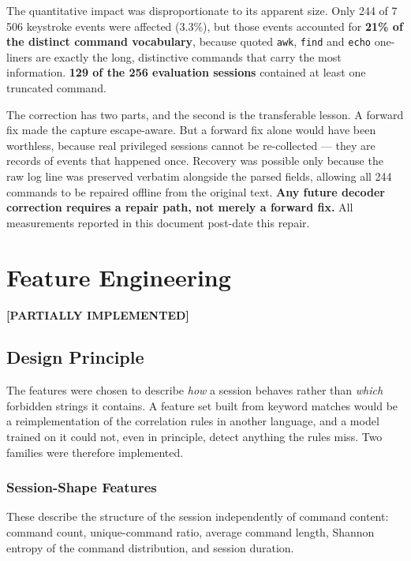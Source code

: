 \documentclass{classeENS}
\providecommand{\statuspartial}{\textbf{[PARTIALLY IMPLEMENTED]}}
\begin{document}
The quantitative impact was disproportionate to its apparent size. Only 244 of 7\,506 keystroke events were affected (3.3\%), but those events accounted for \textbf{21\% of the distinct command vocabulary}, because quoted \texttt{awk}, \texttt{find} and \texttt{echo} one-liners are exactly the long, distinctive commands that carry the most information. \textbf{129 of the 256 evaluation sessions} contained at least one truncated command.

The correction has two parts, and the second is the transferable lesson. A forward fix made the capture escape-aware. But a forward fix alone would have been worthless, because real privileged sessions cannot be re-collected --- they are records of events that happened once. Recovery was possible only because the raw log line was preserved verbatim alongside the parsed fields, allowing all 244 commands to be repaired offline from the original text. \textbf{Any future decoder correction requires a repair path, not merely a forward fix.} All measurements reported in this document post-date this repair.

\section{Feature Engineering}
\label{sec:features}
\statuspartial

\subsection{Design Principle}
The features were chosen to describe \emph{how} a session behaves rather than \emph{which} forbidden strings it contains. A feature set built from keyword matches would be a reimplementation of the correlation rules in another language, and a model trained on it could not, even in principle, detect anything the rules miss. Two families were therefore implemented.

\subsubsection{Session-Shape Features}
These describe the structure of the session independently of command content: command count, unique-command ratio, average command length, Shannon entropy of the command distribution, and session duration.
\end{document}
